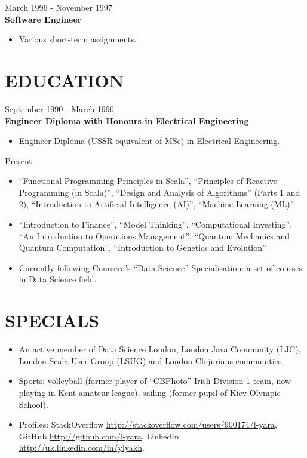 \documentclass{res}
\begin{document}
\begin{resume}
 \hfill        March 1996 - November 1997\\
{\bf Software Engineer}
\begin{itemize} \itemsep -2pt %
 \item Various short-term assignments.
\end{itemize}

\section{EDUCATION}
 \hfill        September 1990 - March 1996\\
{\bf Engineer Diploma with Honours in Electrical Engineering}
\begin{itemize} \itemsep -2pt %
 \item Engineer Diploma (USSR equivalent of MSc) in Electrical Engineering.
\end{itemize}
 \hfill        Present
\begin{itemize} \itemsep -2pt %
 \item ``Functional Programming Principles in Scala'', ``Principles of Reactive Programming (in Scala)'', ``Design and Analysis of Algorithms'' (Parts 1 and 2), ``Introduction to Artificial Intelligence (AI)'', ``Machine Learning (ML)''
 \item ``Introduction to Finance'', ``Model Thinking'', ``Computational Investing'', ``An Introduction to Operations Management'', ``Quantum Mechanics and Quantum Computation'', ``Introduction to Genetics and Evolution''.
 \item Currently following Coursera’s ``Data Science'' Specialisation: a set of courses in Data Science field.
\end{itemize}

\section{SPECIALS}
\begin{itemize}
 \item An active member of Data Science London, London Java Community (LJC), London Scala User Group (LSUG) and London Clojurians communities.
 \item Sports: volleyball (former player of ``CBPhoto'' Irish Division 1 team, now playing in Kent amateur league), sailing (former pupil of Kiev Olympic School).
 \item Profiles: StackOverflow \url{http://stackoverflow.com/users/900174/l-yara}, GitHub \url{http://github.com/l-yara}, LinkedIn \url{http://uk.linkedin.com/in/ylyakh}.
\end{itemize}


\end{resume}
\end{document}
